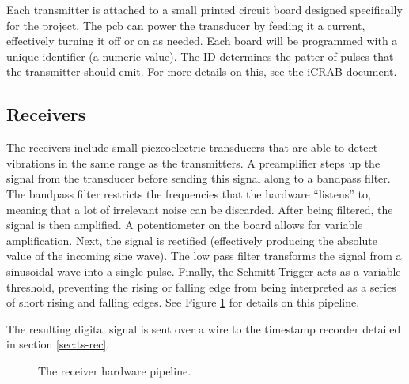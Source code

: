\documentclass[12pt]{article}
\begin{document}
Each transmitter is attached to a small printed circuit board designed
specifically for the project.
The \gls{pcb} can power the transducer by feeding it a current, effectively
turning it off or on as needed.
Each board will be programmed with a unique identifier (a numeric value).
The ID determines the patter of pulses that the transmitter should emit.
For more details on this, see the \gls{iCRAB} document.

\subsection{Receivers}

The receivers include small piezeoelectric transducers that are able to detect
vibrations in the same range as the transmitters.
A preamplifier steps up the signal from the transducer before sending this
signal along to a bandpass filter.
The bandpass filter restricts the frequencies that the hardware ``listens''
to, meaning that a lot of irrelevant noise can be discarded.
After being filtered, the signal is then amplified.
A potentiometer on the board allows for variable amplification.
Next, the signal is
rectified (effectively producing the absolute value of the incoming sine wave).
The low pass filter transforms the signal from a sinusoidal wave into a single
pulse.
Finally, the Schmitt Trigger acts as a variable threshold, preventing the
rising or falling edge from being interpreted as a series of short rising and
falling edges.
See Figure \ref{fig:rx-detail} for details on this pipeline.

The resulting digital signal is sent over a wire to the timestamp
recorder detailed in section \ref{sec:ts-rec}.

\begin{figure}[h]
\begin{center}
\end{center}
\caption{The receiver hardware pipeline.}
\label{fig:rx-detail}
\end{figure}
\end{document}
